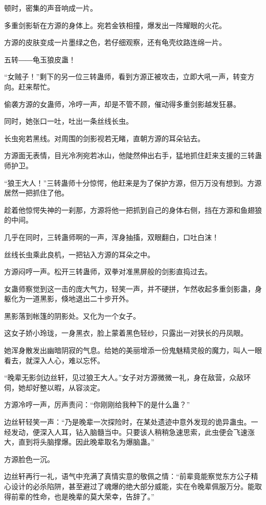 \begin{this_body}
顿时，密集的声音响成一片。

多重剑影斩在方源的身体上。宛若金铁相撞，爆发出一阵耀眼的火花。

方源的皮肤变成一片墨绿之色，若仔细观察，还有龟壳纹路连绵一片。

五转――龟玉狼皮蛊！

“女贼子！”剩下的另一位三转蛊师，看到方源正被攻击，立即大吼一声，转变方向。赶来帮忙。

偷袭方源的女蛊师，冷哼一声，却是不管不顾，催动得多重剑影越发狂暴。

同时，她张口一吐，吐出一条丝线长虫。

长虫宛若黑线。对周围的剑影视若无睹，直朝方源的耳朵钻去。

方源面无表情，目光冷冽宛若冰山，他陡然伸出右手，猛地抓住赶来支援的三转蛊师护卫。

“狼王大人！”三转蛊师十分惊愕，他赶来是为了保护方源，但万万没有想到。方源居然一把抓住了他。

趁着他惊愕失神的一刹那，方源将他一把抓到自己的身体右侧，挡在方源和鱼翅狼的中间。

几乎在同时，三转蛊师啊的一声，浑身抽搐，双眼翻白，口吐白沫！

丝线长虫乘此良机，一把钻入方源的耳朵之中。

方源闷哼一声。松开三转蛊师，双拳对准黑屏般的剑影直捣过去。

女蛊师察觉到这一击的庞大气力，轻笑一声，并不硬拼，乍然收起多重剑影蛊，身躯化为一道黑影，倏地退出二十步开外。

黑影落到帐篷的阴影处。又化为一个女子。

这女子娇小玲珑，一身黑衣，脸上蒙着黑色轻纱，只露出一对狭长的丹凤眼。

她浑身散发出幽暗阴寂的气息。给她的美丽增添一份鬼魅精灵般的魔力，叫人一眼看去，就深入人心，难以忘怀。

“晚辈无影剑边丝轩，见过狼王大人。”女子对方源微微一礼，身在敌营，众敌环伺，她却好整以暇，从容淡定。

方源冷哼一声，厉声责问：“你刚刚给我种下的是什么蛊？”

边丝轩轻笑一声：“乃是晚辈一次探险时，在某处遗迹中意外发现的诡异蛊虫。一经发动，便深入人耳，钻入脑髓当中。只要该人稍稍急速思索，此虫便会飞速涨大，直到将头脑撑爆。因此晚辈取名为爆脑蛊。”

方源脸色一沉。

边丝轩再行一礼，语气中充满了真情实意的敬佩之情：“前辈竟能察觉东方公子精心设计的必杀陷阱，甚至避过了魂爆的绝大部分威能，实在令晚辈佩服万分。能取得前辈的性命，也是晚辈的莫大荣幸，告辞了。”


\end{this_body}
